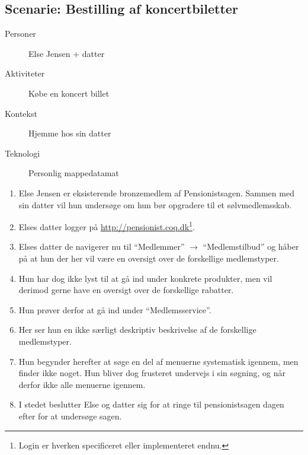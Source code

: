 \subsection{Scenarie: Bestilling af koncertbiletter}

\begin{description}
    \item[Personer] Else Jensen + datter
    \item[Aktiviteter] Købe en koncert billet
    \item[Kontekst] Hjemme hos sin datter
    \item[Teknologi] Personlig mappedatamat
\end{description}

\begin{enumerate}
    \item Else Jensen er eksisterende bronzemedlem af Pensionistsagen. Sammen
    med sin datter vil hun undersøge om hun bør opgradere til et
    sølvmedlemsskab.
    \item Elses datter logger på
          \url{http://pensionist.coq.dk}\footnote{Login er hverken
          specificeret eller implementeret endnu.}.
    \item Elses datter de navigerer nu til ``Medlemmer'' $\to$ ``Medlemstilbud''
    og håber på at hun der her vil være en oversigt over de forskellige
    medlemstyper.
    \item Hun har dog ikke lyst til at gå ind under konkrete produkter, men vil
    derimod gerne have en oversigt over de forskellige rabatter.
    \item Hun prøver derfor at gå ind under ``Medlemsservice''.
    \item Her ser hun en ikke særligt deskriptiv beskrivelse af de forskellige
    medlemstyper.
    \item Hun begynder herefter at søge en del af menuerne systematisk igennem,
    men finder ikke noget. Hun bliver dog frusteret undervejs i sin søgning, og
    når derfor ikke alle menuerne igennem.
    \item I stedet beslutter Else og datter sig for at ringe til pensionistsagen
    dagen efter for at undersøge sagen.
\end{enumerate}
